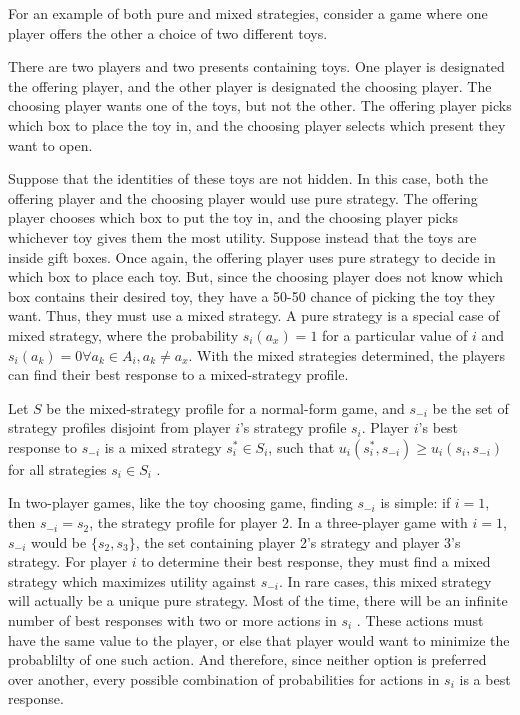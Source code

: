 For an example of both pure and mixed strategies, consider a game where one player offers the other a choice of two different toys.

\begin{exmp}
  There are two players and two presents containing toys. One player is designated the offering player, and the other player is designated the choosing player. The choosing player wants one of the toys, but not the other. The offering player picks which box to place the toy in, and the choosing player selects which present they want to open.
\end{exmp}

Suppose that the identities of these toys are not hidden. In this case, both the offering player and the choosing player would use pure strategy. The offering player chooses which box to put the toy in, and the choosing player picks whichever toy gives them the most utility. Suppose instead that the toys are inside gift boxes. Once again, the offering player uses pure strategy to decide in which box to place each toy. But, since the choosing player does not know which box contains their desired toy, they have a 50-50 chance of picking the toy they want. Thus, they must use a mixed strategy. A pure strategy is a special case of mixed strategy, where the probability $s_i(a_x)=1$ for a particular value of $i$ and $s_i(a_k)=0 \forall a_k\in A_i, a_k \neq a_x$. With the mixed strategies determined, the players can find their best response to a mixed-strategy profile.

\begin{define}
  Let $S$ be the mixed-strategy profile for a normal-form game, and $s_{-i}$ be the set of strategy profiles disjoint from player $i$'s strategy profile $s_i$. Player $i$'s best response to $s_{-i}$ is a mixed strategy $s_i^*\in S_i$, such that $u_i(s_i^*,s_{-i}) \ge u_i(s_i, s_{-i})$ for all strategies $s_i\in S_i$ \cite{shoh09}.
\end{define}

In two-player games, like the toy choosing game, finding $s_{-i}$ is simple: if $i=1$, then $s_{-i}=s_2$, the strategy profile for player 2. In a three-player game with $i=1$, $s_{-i}$ would be $\{s_2, s_3\}$, the set containing player 2's strategy and player 3's strategy. For player $i$ to determine their best response, they must find a mixed strategy which maximizes utility against $s_{-i}$. In rare cases, this mixed strategy will actually be a unique pure strategy. Most of the time, there will be an infinite number of best responses with two or more actions in $s_i$ \cite{shoh09}. These actions must have the same value to the player, or else that player would want to minimize the probablilty of one such action. And therefore, since neither option is preferred over another, every possible combination of probabilities for actions in $s_i$ is a best response.\\

